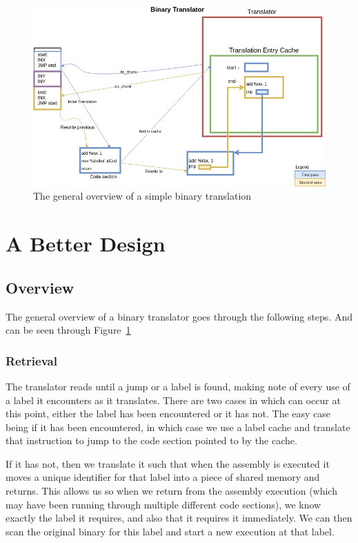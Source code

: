 \begin{figure}[ht] \includegraphics[width=\textwidth]{./images/translator.png}
\caption{The general overview of a simple binary translation} \label{fig:trans}
\end{figure}

\section{A Better Design}

\subsection{Overview}

The general overview of a binary translator goes through the following steps.
And can be seen through Figure~\ref{fig:trans} 

\subsubsection{Retrieval} The translator reads until a jump or a label is found,
making note of every use of a label it encounters as it translates.  There are
two cases in which can occur at this point, either the label has been
encountered or it has not.  The easy case being if it has been encountered, in
which case we use a label cache and translate that instruction to jump 
to the code section pointed to by the cache.

If it has not, then we translate it such that when the assembly is executed it
moves a unique identifier for that label into a piece of shared memory and
returns.  This allows us so when we return from the assembly execution (which
may have been running through multiple different code sections), we know
exactly the label it requires, and also that it requires it immediately. We can
then scan the original binary for this label and start a new execution at that
label.

